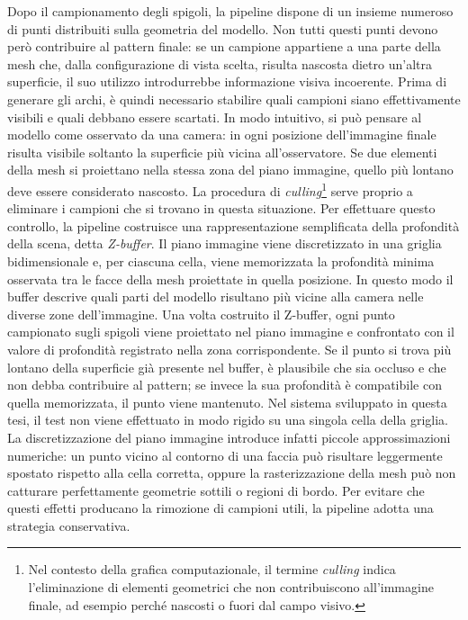 \documentclass[a4paper,11pt,titlepage,twoside]{book}
\newcommand{\1}{\mathbf{1}}
\numberwithin{equation}{chapter}
\theoremstyle{plain}
\theoremstyle{definition}
\begin{document}
	Dopo il campionamento degli spigoli, la pipeline dispone di un insieme numeroso di punti distribuiti sulla geometria del modello. Non tutti questi punti devono però contribuire al pattern finale: se un campione appartiene a una parte della mesh che, dalla configurazione di vista scelta, risulta nascosta dietro un’altra superficie, il suo utilizzo introdurrebbe informazione visiva incoerente. Prima di generare gli archi, è quindi necessario stabilire quali campioni siano effettivamente visibili e quali debbano essere scartati.
	In modo intuitivo, si può pensare al modello come osservato da una camera: in ogni posizione dell’immagine finale risulta visibile soltanto la superficie più vicina all’osservatore. Se due elementi della mesh si proiettano nella stessa zona del piano immagine, quello più lontano deve essere considerato nascosto. La procedura di \emph{culling}\footnote{Nel contesto della grafica computazionale, il termine \emph{culling} indica l’eliminazione di elementi geometrici che non contribuiscono all’immagine finale, ad esempio perché nascosti o fuori dal campo visivo.} serve proprio a eliminare i campioni che si trovano in questa situazione.
	Per effettuare questo controllo, la pipeline costruisce una rappresentazione semplificata della profondità della scena, detta \emph{Z-buffer}. Il piano immagine viene discretizzato in una griglia bidimensionale e, per ciascuna cella, viene memorizzata la profondità minima osservata tra le facce della mesh proiettate in quella posizione. In questo modo il buffer descrive quali parti del modello risultano più vicine alla camera nelle diverse zone dell’immagine.
	Una volta costruito il Z-buffer, ogni punto campionato sugli spigoli viene proiettato nel piano immagine e confrontato con il valore di profondità registrato nella zona corrispondente. Se il punto si trova più lontano della superficie già presente nel buffer, è plausibile che sia occluso e che non debba contribuire al pattern; se invece la sua profondità è compatibile con quella memorizzata, il punto viene mantenuto.
	Nel sistema sviluppato in questa tesi, il test non viene effettuato in modo rigido su una singola cella della griglia. La discretizzazione del piano immagine introduce infatti piccole approssimazioni numeriche: un punto vicino al contorno di una faccia può risultare leggermente spostato rispetto alla cella corretta, oppure la rasterizzazione della mesh può non catturare perfettamente geometrie sottili o regioni di bordo. Per evitare che questi effetti producano la rimozione di campioni utili, la pipeline adotta una strategia conservativa.
\end{document}
